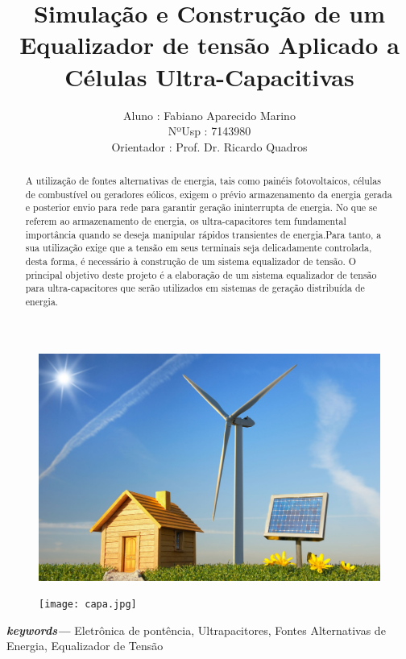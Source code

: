 \documentclass[11pt, a4paper, oneside]{article}
\title{Simulação e Construção de um Equalizador de tensão Aplicado a Células Ultra-Capacitivas}
\author{Aluno : Fabiano Aparecido Marino \\NºUsp : 7143980 \\Orientador : Prof. Dr. Ricardo Quadros}
\providecommand{\keywords}[1]{\textbf{\textit{keywords---}} #1}
\begin{document}
 	\newpage
	\thispagestyle{empty}
	\clearpage
	\begin{figure}
		\centering
		\includegraphics[width=1\linewidth]{capa_principal}
		\label{fig:adc_dac_ideal}
	
	\end{figure}
	\clearpage
	\newpage

\maketitle

\begin{figure}[h!]
\centering
\texttt{[image: capa.jpg]}
\end{figure}

\newpage

\begin{abstract}
   A utilização de fontes alternativas de energia, tais como painéis fotovoltaicos,
células de combustível ou geradores eólicos, exigem o prévio armazenamento da
energia gerada e posterior envio para rede para garantir geração ininterrupta de
energia. No que se referem ao armazenamento de energia, os ultra-capacitores tem
fundamental importância quando se deseja manipular rápidos transientes de
energia.Para tanto, a sua utilização exige que a tensão em seus terminais seja
delicadamente controlada, desta forma, é necessário à construção de um sistema
equalizador de tensão. O principal objetivo deste projeto é a elaboração
de um sistema equalizador de tensão para ultra-capacitores que serão utilizados em
sistemas de geração distribuída de energia.
\end{abstract}

\keywords{ Eletrônica de pontência, Ultrapacitores, Fontes Alternativas de Energia, Equalizador de Tensão}
\end{document}
